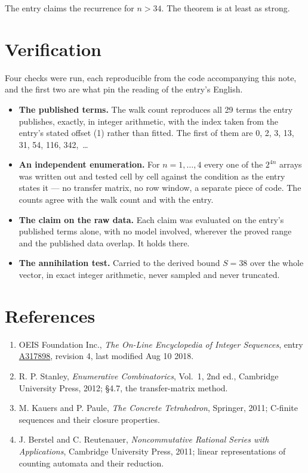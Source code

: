 \documentclass[11pt]{article}
\theoremstyle{definition}
\begin{document}
The entry claims the recurrence for $n > 34$. The theorem is at least as strong.

\section{Verification}

Four checks were run, each reproducible from the code accompanying this note, and the first two are what pin the reading of the entry's English.

\begin{itemize}

\item {\bfseries The published terms.} The walk count reproduces all 29 terms the entry publishes, exactly, in integer arithmetic, with the index taken from the entry's stated offset (1) rather than fitted. The first of them are 0, 2, 3, 13, 31, 54, 116, 342,~\dots

\item {\bfseries An independent enumeration.} For $n = 1,\dots,4$ every one of the $2^{4n}$ arrays was written out and tested cell by cell against the condition as the entry states it --- no transfer matrix, no row window, a separate piece of code. The counts agree with the walk count and with the entry.

\item {\bfseries The claim on the raw data.} Each claim was evaluated on the entry's published terms alone, with no model involved, wherever the proved range and the published data overlap. It holds there.

\item {\bfseries The annihilation test.} Carried to the derived bound $S = 38$ over the whole vector, in exact integer arithmetic, never sampled and never truncated.

\end{itemize}

\section{References}

\begin{enumerate}

\item OEIS Foundation Inc., \emph{The On-Line Encyclopedia of Integer Sequences}, entry \href{https://oeis.org/A317898}{A317898}, revision 4, last modified Aug 10 2018.

\item R. P. Stanley, \emph{Enumerative Combinatorics}, Vol.~1, 2nd ed., Cambridge University Press, 2012; \S4.7, the transfer-matrix method.

\item M. Kauers and P. Paule, \emph{The Concrete Tetrahedron}, Springer, 2011; C-finite sequences and their closure properties.

\item J. Berstel and C. Reutenauer, \emph{Noncommutative Rational Series with Applications}, Cambridge University Press, 2011; linear representations of counting automata and their reduction.

\end{enumerate}
\end{document}
